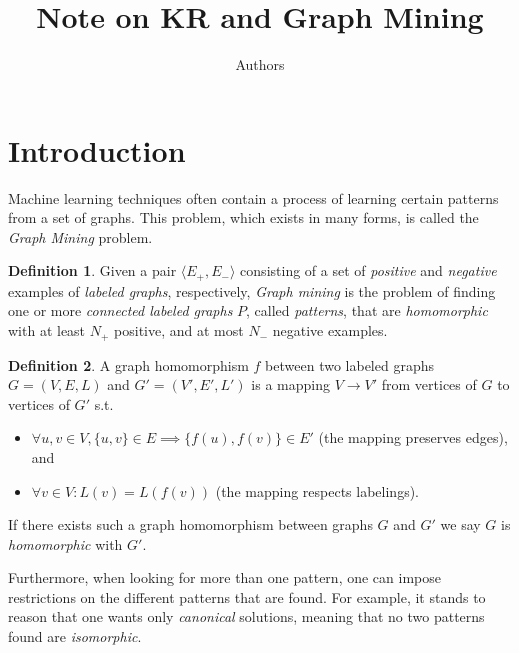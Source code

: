 \documentclass{article}
\author{Authors}
\title{Note on KR and Graph Mining}
\theoremstyle{definition}
\newtheorem{definition}{Definition}[section]
\begin{document}
\maketitle

\section{Introduction}

Machine learning techniques often contain a process of learning certain patterns from a set of graphs.
This problem, which exists in many forms, is called the \emph{Graph Mining} problem.

\begin{definition}
Given a pair $\langle E_{+},E_{-}\rangle$ consisting of a set of \emph{positive} and \emph{negative} examples of \emph{labeled graphs}, respectively,
\emph{Graph mining} is the problem of finding one or more \emph{connected labeled graphs} $P$, called \emph{patterns},
that are \emph{homomorphic} with at least $N_{+}$ positive, and at most $N_{-}$ negative examples.
\end{definition}

\begin{definition}
\label{def:GM1}
A graph homomorphism $f$ between two labeled graphs $G = (V,E,L)$ and $G' = (V',E',L')$ is a mapping $V \rightarrow V'$ from vertices of $G$ to vertices of $G'$ s.t. 
\begin{itemize}
\item $\forall u,v \in V, \lbrace u,v\rbrace \in E \implies \lbrace f(u),f(v)\rbrace \in E'$ (the mapping preserves edges), and 
\item $\forall v \in V : L(v) = L(f(v))$ (the mapping respects labelings).
\end{itemize}
If there exists such a graph homomorphism between graphs $G$ and $G'$ we say $G$ is \emph{homomorphic} with $G'$.
\end{definition}


Furthermore, when looking for more than one pattern, one can impose restrictions on the different patterns that are found.
For example, it stands to reason that one wants only \emph{canonical} solutions, meaning that no two patterns found are \emph{isomorphic}.
\end{document}
